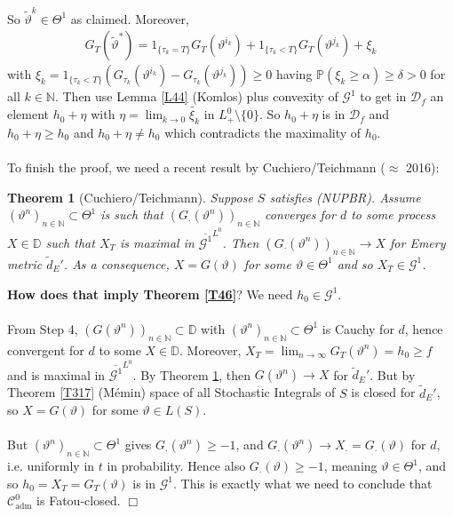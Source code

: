 \documentclass[12pt,a4paper, twoside]{article}
\newtheorem{thm}{Theorem}[section]
\theoremstyle{definition}
\newcommand{\PP}{\mathbb{P}} %
\begin{document}
So $\widetilde{\vartheta}^k \in \Theta^1$ as claimed.
\newpage Moreover, 
\begin{align*}
G_T( \widetilde{\vartheta}^*) = 1_{\{ \tau_k = T\}} G_T( \vartheta^{i_k}) + 1_{\{ \tau_k < T\}} G_T( \vartheta^{j_k}) + \xi_k
\end{align*}
 with $\xi_k = 1_{\{ \tau_k < T\}} ( G_{\tau_k} ( \vartheta^{i_k}) - G_{\tau_k} ( \vartheta^{j_k})) \geq 0$ having $\PP( \xi_k \geq \alpha) \geq \delta > 0$ for all $k \in \mathbb{N}$. Then use Lemma \ref{L44} (Komlos) plus convexity of $\mathcal{G}^1$ to get in $\mathcal{D}_f$ an element $h_0 + \eta$ with $\eta = \lim_{k \to 0} \widetilde{ \xi_k}$ in $L_+^0 \setminus \{0\}$. So $h_0 + \eta$ is in $\mathcal{D}_f$ and $h_0 + \eta \geq h_0$ and $h_0 + \eta \neq h_0$ which contradicts the maximality of $h_0$. 
 \\\\
 To finish the proof, we need a recent result by Cuchiero/Teichmann ($\approx$ 2016):
\begin{thm}[Cuchiero/Teichmann] \label{T47} Suppose $S$ satisfies (NUPBR). Assume $( \vartheta^n)_{n \in \mathbb{N}} \subset \Theta^1$ is such that $(G_\cdot ( \vartheta^n))_{n \in \mathbb{N}}$ converges for $d$ to some process $X \in \mathbb{D}$ such that $X_T$ is maximal in $\overline{\mathcal{G}^1}^{L^0}$. Then $(G_\cdot ( \vartheta^n))_{n \in \mathbb{N}} \to X$ for Emery metric $\widetilde{d}_E'$. As a consequence, $X= G( \vartheta)$ for some $\vartheta \in \Theta^1$ and so $X_T \in \mathcal{G}^1$. 
\end{thm}
\noindent \textbf{How does that imply Theorem \ref{T46}}? We need $h_0 \in \mathcal{G}^1$.\\
\\
From Step 4, $(G( \vartheta^n))_{n \in \mathbb{N}} \subset \mathbb{D}$ with $( \vartheta^n)_{n \in \mathbb{N}} \subset \Theta^1$ is Cauchy for $d$, hence convergent for $d$ to some $X \in \mathbb{D}$. Moreover,  $ X_T= \lim_{n \to \infty} G_T( \vartheta^n)=h_0 \geq f$ and is maximal in $\overline{\mathcal{G}^1}^{L^0}$. By Theorem \ref{T47}, then $G( \vartheta^n) \to X$ for $\widetilde{d}_E'$. But by Theorem \ref{T317} (Mémin) space of all Stochastic Integrals of $S$ is closed for $\widetilde{d}_E'$, so $X=G ( \vartheta)$ for some $\vartheta \in L(S)$. 
\\\\
But $( \vartheta^n)_{n \in \mathbb{N}} \subset \Theta^1$ gives $G_\cdot ( \vartheta^n) \geq -1$, and $G_\cdot ( \vartheta^n) \to X_\cdot = G_\cdot ( \vartheta)$ for $d$, i.e. uniformly in $t$ in probability. Hence also $G_\cdot ( \vartheta) \geq -1$, meaning $\vartheta \in \Theta^1$, and so $h_0 = X_T = G_T( \vartheta)$ is in $\mathcal{G}^1$. This is exactly what we need to conclude that $\mathcal{C}_\text{adm}^0$ is Fatou-closed. \hfill $\Box$
\end{document}
